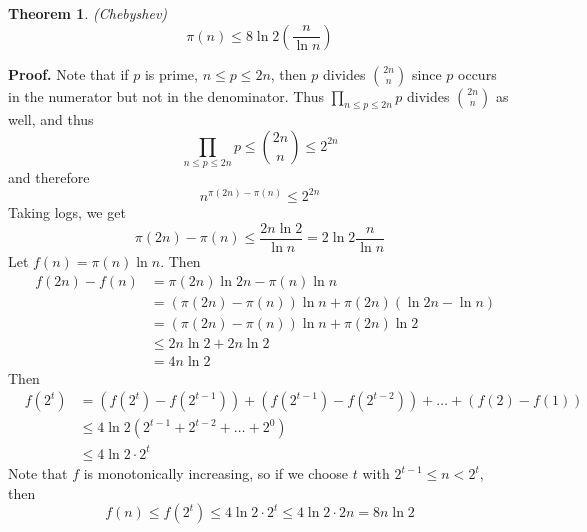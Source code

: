 \documentclass[12pt]{article}
\newtheorem{thm}{Theorem}
\begin{document}
\begin{thm} \emph{(Chebyshev)}
\[\pi(n)\leq 8\ln 2\left(\frac{n}{\ln n}\right)\]
\end{thm}
\textbf{Proof.}
Note that if $p$ is prime, $n\leq p\leq 2n$, then $p$ divides $\binom{2n}{n}$ since $p$ occurs in the numerator but not in the denominator. Thus $\prod_{n\leq p\leq 2n} p$ divides $\binom{2n}{n}$ as well, and thus
\[\prod_{n\leq p\leq 2n} p\leq\binom{2n}{n}\leq 2^{2n}\]
and therefore
\[n^{\pi(2n)-\pi(n)}\leq 2^{2n}\]
Taking logs, we get
\[\pi(2n)-\pi(n)\leq\frac{2n\ln 2}{\ln n}=2\ln 2\frac{n}{\ln n}\]
Let $f(n)=\pi(n)\ln n$. Then
\begin{eqnarray*}
&f(2n)-f(n)&=\pi(2n)\ln 2n-\pi(n)\ln n\\
&&=(\pi(2n)-\pi(n))\ln n + \pi(2n)(\ln 2n-\ln n)\\
&&=(\pi(2n)-\pi(n))\ln n+\pi(2n)\ln 2\\
&&\leq 2n\ln 2+2n\ln 2\\
&&=4n\ln 2
\end{eqnarray*}
Then
\begin{eqnarray*}
&f(2^t)&=(f(2^t)-f(2^{t-1}))+(f(2^{t-1})-f(2^{t-2}))+\ldots+(f(2)-f(1))\\
&&\leq 4 \ln 2(2^{t-1}+2^{t-2}+\ldots+2^0)\\
&&\leq 4\ln 2\cdot 2^t
\end{eqnarray*}
Note that $f$ is monotonically increasing, so if we choose $t$ with $2^{t-1}\leq n<2^t$, then
\[f(n)\leq f(2^t)\leq 4\ln 2\cdot 2^t\leq 4\ln 2\cdot 2n=8n\ln 2
\]

\end{document}

